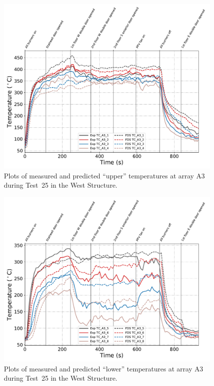 \begin{figure}[!h]
	\centering
	\includegraphics[width=\columnwidth]{Figures/Plots/Validation/Temperature/Test_25_TC_A3_upper}
	\caption{Plots of measured and predicted ``upper'' temperatures at array A3 during Test~25 in the West Structure.}
	\label{fig:TCA3_upper_data_Test25}
\end{figure}
\begin{figure}[!h]
	\centering
	\includegraphics[width=\columnwidth]{Figures/Plots/Validation/Temperature/Test_25_TC_A3_lower}
	\caption{Plots of measured and predicted ``lower'' temperatures at array A3 during Test~25 in the West Structure.}
	\label{fig:TCA3_lower_data_Test25}
\end{figure}

